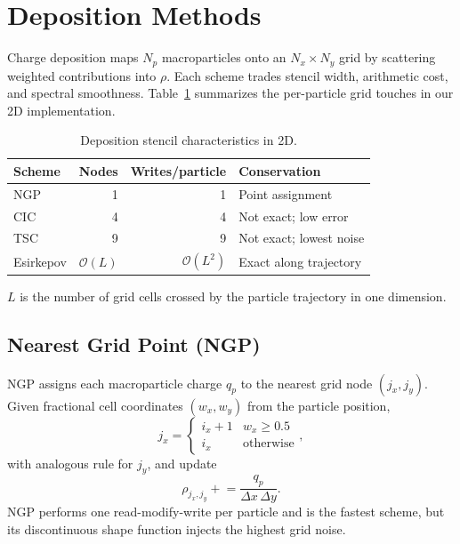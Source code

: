 \section{Deposition Methods}
\label{sec:methods}
Charge deposition maps $N_p$ macroparticles onto an $N_x \times N_y$ grid by scattering weighted contributions into $\rho$.
Each scheme trades stencil width, arithmetic cost, and spectral smoothness.
Table~\ref{tab:stencil} summarizes the per-particle grid touches in our 2D implementation.

\begin{table}[t]
\centering
\caption{Deposition stencil characteristics in 2D.}
\label{tab:stencil}
\begin{tabular}{lrrl}
\toprule
Scheme & Nodes & Writes/particle & Conservation \\
\midrule
NGP  & 1  & 1 & Point assignment \\
CIC  & 4  & 4 & Not exact; low error \\
TSC  & 9  & 9 & Not exact; lowest noise \\
Esirkepov & $\mathcal{O}(L)$ & $\mathcal{O}(L^2)$ & Exact along trajectory \\
\bottomrule
\end{tabular}
\end{table}
\noindent$L$ is the number of grid cells crossed by the particle trajectory in one dimension.

\subsection{Nearest Grid Point (NGP)}
NGP assigns each macroparticle charge $q_p$ to the nearest grid node $(j_x,j_y)$.
Given fractional cell coordinates $(w_x,w_y)$ from the particle position,
\begin{equation}
    j_x = \begin{cases} i_x+1 & w_x \geq 0.5 \\ i_x & \text{otherwise} \end{cases},
\end{equation}
with analogous rule for $j_y$, and update
\begin{equation}
    \rho_{j_x,j_y} \mathrel{+}= \frac{q_p}{\Delta x\,\Delta y}.
\end{equation}
NGP performs one read-modify-write per particle and is the fastest scheme, but its discontinuous shape function injects the highest grid noise.

